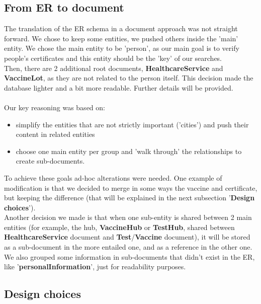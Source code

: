 \documentclass{article}[IEEEtran]
\begin{document}
\subsection{From ER to document}

The translation of the ER schema in a document approach was not straight forward. We chose to keep some entities, we pushed others inside the 'main' entity. We chose the main entity to be 'person', as our main goal is to verify people's certificates and this entity should be the 'key' of our searches. 
\\
Then, there are 2 additional root documents, \textbf{HealthcareService} and \textbf{VaccineLot}, as they are not related to the person itself. This decision made the database lighter and a bit more readable. Further details will be provided. 
\\\\
Our key reasoning was based on: 

\begin{itemize}
    \item simplify the entities that are not strictly important ('cities') and push their content in related entities
    \item choose one main entity per group and 'walk through' the relationships to create sub-documents.
\end{itemize} 

To achieve these goals ad-hoc alterations were needed.
\newpage
One example of modification is that we decided to merge in some ways the vaccine and certificate, but keeping the difference (that will be explained in the next subsection '\textbf{Design choices}').
\\
Another decision we made is that when one sub-entity is shared between 2 main entities (for example, the hub, \textbf{VaccineHub} or \textbf{TestHub}, shared between \textbf{HealthcareService} document and \textbf{Test}/\textbf{Vaccine} document), it will be stored as a sub-document in the more entailed one, and as a reference in the other one.
\\
We also grouped some information in sub-documents that didn't exist in the ER, like '\textbf{personalInformation}', just for readability purposes.


\subsection{Design choices}
\end{document}
